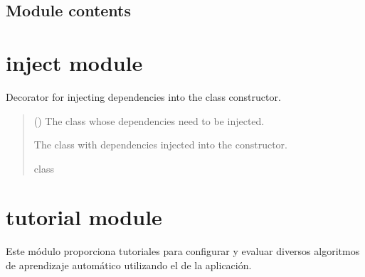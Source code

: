 \documentclass[letterpaper,10pt,english]{sphinxmanual}
\begin{document}
\subsection{Module contents}
\label{\detokenize{infrastructure:module-infrastructure}}\label{\detokenize{infrastructure:module-contents}}
\sphinxstepscope


\section{inject module}
\label{\detokenize{inject:module-inject}}\label{\detokenize{inject:inject-module}}\label{\detokenize{inject::doc}}

\begin{fulllineitems}
\label{\detokenize{inject:inject.Inject}}
\pysigstartsignatures
{}
\pysigstopsignatures
\sphinxAtStartPar
Decorator for injecting dependencies into the class constructor.
\begin{quote}\begin{description}
\sphinxAtStartPar
{} () \textendash{} The class whose dependencies need to be injected.

\sphinxAtStartPar
The class with dependencies injected into the constructor.

\sphinxAtStartPar
class

\end{description}\end{quote}

\end{fulllineitems}


\sphinxstepscope


\section{tutorial module}
\label{\detokenize{tutorial:module-tutorial}}\label{\detokenize{tutorial:tutorial-module}}\label{\detokenize{tutorial::doc}}
\sphinxAtStartPar
Este módulo proporciona tutoriales para configurar y evaluar diversos algoritmos de aprendizaje automático utilizando el  de la aplicación.
\end{document}
